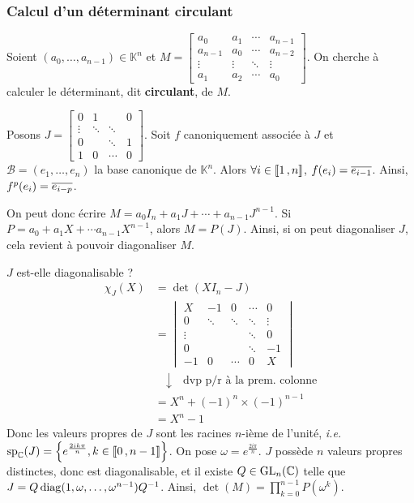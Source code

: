     \subsubsection{Calcul d’un déterminant circulant}

    Soient $(a_0, \ldots, a_{n-1}) \in \mathbb{K}^n$ et $M = \begin{bmatrix}
        a_0 & a_1 & \cdots & a_{n-1} \\
        a_{n-1} & a_0 & \cdots & a_{n-2} \\
        \vdots & \vdots & \ddots & \vdots \\
        a_1 & a_2 & \cdots & a_0
    \end{bmatrix}$. On cherche à calculer le déterminant, dit \textbf{circulant}, de $M$.

    Posons $J = \begin{bmatrix}
        0 & 1 & & 0 \\
        \vdots & \ddots & \ddots & \\
        0 & & \ddots & 1 \\
        1 & 0 & \cdots & 0
    \end{bmatrix}$. Soit $f$ canoniquement associée à $J$ et $\mathcal{B} = (e_1,\ldots, e_n)$ la base canonique de $\mathbb{K}^n$. Alors $\forall i \in \left\llbracket 1 \, , n \right\rrbracket$, $f(e_i) = \overline{e_{i-1}}$. Ainsi, $f^p(e_i) = \overline{e_{i - p}}$. 

    On peut donc écrire $M = a_0 I_n + a_1 J + \cdots + a_{n-1} J^{n-1}$. Si $P = a_0 + a_1 X + \cdots a_{n-1} X^{n-1}$, alors $M = P(J)$. Ainsi, si on peut diagonaliser $J$, cela revient à pouvoir diagonaliser $M$.

    $J$ est-elle diagonalisable ?
    \begin{align*}
        \chi_J(X) 
        &= \det(X I_n - J) \\
        &= \begin{vmatrix}
            X & - 1 & 0 & \cdots & 0 \\
            0 & \ddots & \ddots & \ddots & \vdots \\
            \vdots & & & \ddots & 0 \\
            0 & & & \ddots & -1 \\
            -1 & 0 & \cdots & 0 & X
        \end{vmatrix} \\
        &\quad \downarrow \quad \text{dvp p/r à la prem. colonne} \\
        &= X^n + (-1)^n \times (-1)^{n-1} \\
        &= X^n - 1
    \end{align*}
    Donc les valeurs propres de $J$ sont les racines $n$-ième de l’unité, \textit{i.e.} $\operatorname{sp}_{\mathbb{C}}(J) = \left\{e^{\frac{2ik\pi}{n}}, k \in \left\llbracket 0 \, , n-1 \right\rrbracket\right\}$. On pose $\omega = e^{\frac{2i\pi}{n}}$. $J$ possède $n$ valeurs propres distinctes, donc est diagonalisable, et il existe $Q \in \operatorname{GL}_n(\mathbb{C})$ telle que $J = Q \operatorname{diag}(1,\omega, \ldots, \omega^{n-1}) Q^{-1}$. Ainsi, $\det(M) = \prod_{k=0}^{n-1} P(\omega^k)$.

